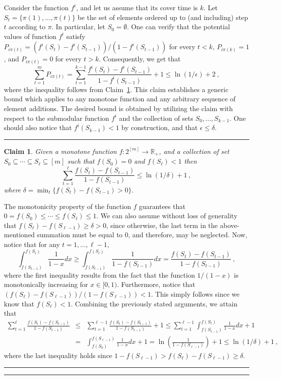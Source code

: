 \documentclass[11pt]{article}
\theoremstyle{plain}
\newtheorem{claim}[theorem]{Claim}
\theoremstyle{definition}
\newcommand{\qedsymb}{\hfill{\rule{2mm}{2mm}}}
\renewenvironment{proof}{\begin{trivlist} \item[\hspace{\labelsep}{\bf \noindent Proof.\/}] }{\qedsymb\end{trivlist}}\newenvironment{proofof}[1]{\begin{trivlist} \item[\hspace{\labelsep}{\bf \noindent Proof of #1.\/}] }{\qedsymb\end{trivlist}}\newenvironment{MyEqn}[1]{\setlength\arraycolsep{2pt}\begin{eqnarray*} #1}{\end{eqnarray*}}
\newcommand{\bbR}{\mathbb{R}}
\begin{document}
\begin{proof}
\begin{proof}
Consider the function $f^i$, and let us assume that its cover time
is $k$. Let $S_t = \{ \pi(1), \ldots, \pi(t) \}$ be the set of
elements ordered up to (and including) step $t$ according to
$\pi$. In particular, let $S_0 = \emptyset$. One can verify that
the potential values of function $f^i$ satisfy $P_{i \pi(t)} =
(f^i(S_{t}) - f^i(S_{t-1}))/(1 - f^i(S_{t-1}))$ for every $t < k$,
$P_{i \pi(k)} = 1$, and $P_{i \pi(t)} = 0$ for every $t
> k$. Consequently, we get that
$$
\sum_{t=1}^{m} P_{i \pi(t)} = \sum_{t=1}^{k-1} \frac{f^i(S_{t}) -
f^i(S_{t-1})}{1 - f^i(S_{t-1})} + 1 \leq \ln(1 / \epsilon) + 2  \
,
$$
where the inequality follows from
Claim~\ref{claim:SequenceStretch}. This claim establishes a
generic bound which applies to any monotone function and any
arbitrary sequence of element additions. The desired bound is
obtained by utilizing the claim with respect to the submodular
function $f^i$ and the collection of sets $S_0, \ldots, S_{k-1}$.
One should also notice that $f^i(S_{k-1}) < 1$ by construction,
and that $\epsilon \leq \delta$.~
\end{proof}

\begin{claim} \label{claim:SequenceStretch}
Given a monotone function $f: 2^{[m]} \to \bbR_+$, and a
collection of set $S_0 \subseteq \cdots \subseteq S_\ell \subseteq
[m]$ such that $f(S_0) = 0$ and $f(S_\ell) < 1$ then
$$
\sum_{t = 1}^{\ell} \frac{f(S_{t}) - f(S_{t-1})}{1 - f(S_{t-1})}
\leq \ln(1 / \delta) + 1 \ ,
$$
where $\delta = \min_t\{f(S_{t}) - f(S_{t-1}) > 0\}$.
\end{claim}
\begin{proof}
The monotonicity property of the function $f$ guarantees that $0 =
f(S_0) \leq \cdots \leq f(S_\ell) \leq 1$. We can also assume
without loss of generality that $f(S_\ell) - f(S_{\ell-1}) \geq
\delta > 0$, since otherwise, the last term in the above-mentioned
summation must be equal to $0$, and therefore, may be neglected.
Now, notice that for any $t = 1, \ldots, \ell - 1$,
$$
\int_{f(S_{t-1})}^{f(S_{t})} \frac{1}{1-x}dx \geq
\int_{f(S_{t-1})}^{f(S_{t})} \frac{1}{1-f(S_{t-1})}dx =
\frac{f(S_{t}) - f(S_{t-1})}{1-f(S_{t-1})} \ ,
$$
where the first inequality results from the fact that the function
$1 / (1 - x)$ is monotonically increasing for $x \in [0,1)$.
Furthermore, notice that $(f(S_\ell) - f(S_{\ell-1})) / (1 -
f(S_{\ell-1})) < 1$. This simply follows since we know that
$f(S_\ell) < 1$. Combining the previously stated arguments, we
attain that
\begin{eqnarray*}
\sum_{t = 1}^{\ell} \frac{f(S_{t}) - f(S_{t-1})}{1 - f(S_{t-1})} &
\leq & \sum_{t = 1}^{\ell - 1} \frac{f(S_{t}) - f(S_{t-1})}{1 -
f(S_{t-1})} + 1 \leq \sum_{t = 1}^{\ell - 1} \int_{f(S_{t-1})}^{f(S_{t})} \frac{1}{1-x}dx + 1 \\
& = &\int_{f(S_0)}^{f(S_{\ell-1})} \frac{1}{1-x}dx + 1 =  \ln
\left(\frac{1}{1 - f(S_{\ell-1})}\right) + 1 \leq \ln(1 / \delta)
+ 1 \ ,
\end{eqnarray*}
where the last inequality holds since $1-f(S_{\ell-1}) > f(S_\ell)
-f(S_{\ell-1}) \geq \delta$.~
\end{proof}


\end{proof}
\end{document}
